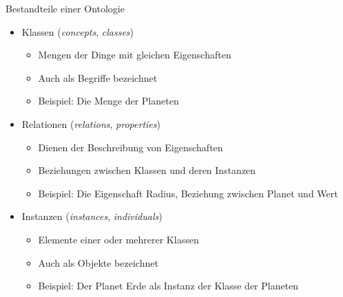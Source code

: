 \documentclass{beamer}
\begin{document}
\begin{frame}{Bestandteile einer Ontologie}
	
	\begin{itemize}
		\item Klassen (\emph{concepts}, \emph{classes})
		\begin{itemize}
			\item Mengen der Dinge mit gleichen Eigenschaften
			\item Auch als Begriffe bezeichnet
			\item Beispiel: Die Menge der Planeten
		\end{itemize}
		\item Relationen (\emph{relations}, \emph{properties})
		\begin{itemize}
			\item Dienen der Beschreibung von Eigenschaften
			\item Beziehungen zwischen Klassen und deren Instanzen
			\item Beispiel: Die Eigenschaft Radius, Beziehung zwischen Planet und Wert
		\end{itemize}
		\item Instanzen (\emph{instances}, \emph{individuals})
		\begin{itemize}
			\item Elemente einer oder mehrerer Klassen
			\item Auch als Objekte bezeichnet
			\item Beispiel: Der Planet Erde als Instanz der Klasse der Planeten
		\end{itemize}
	\end{itemize}
	
\end{frame}
\end{document}
